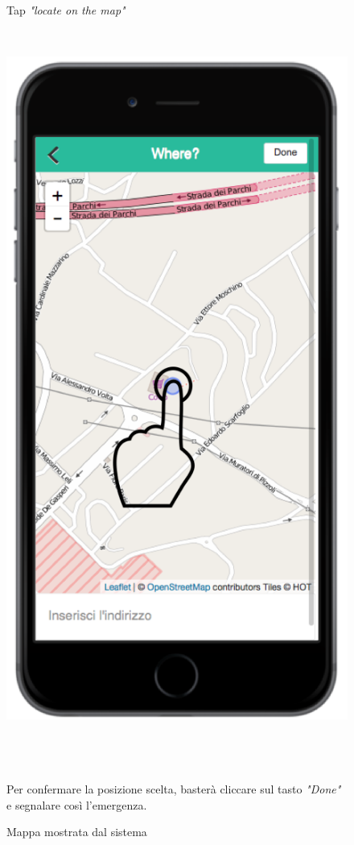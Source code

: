 \begin{figure}
\begin{minipage}[b]{6cm}
	\caption{Tap \textit{"locate on the map"} }
	\label{fig:sceltamappa}
 \end{minipage}
 \ \hspace{6 mm} \hspace{7 mm} \
 \begin{minipage}[b]{6cm}
\includegraphics[scale=0.9]{interfaccia/mappasegnala.png}
	\caption{Mappa mostrata dal sistema }
	\label{fig:mappa-segnala}
	
 \end{minipage}
 \\ \\ \\
Per confermare la posizione scelta, basterà cliccare sul tasto \textit{"Done"} e segnalare così l'emergenza. 
\end{figure}



